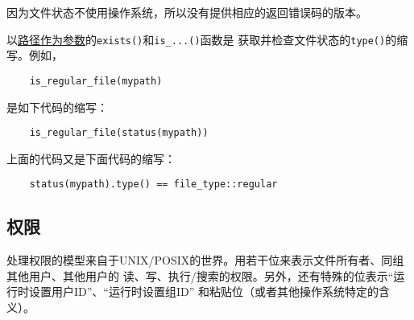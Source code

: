 因为文件状态不使用操作系统，所以没有提供相应的返回错误码的版本。

以\hyperref[ch20.4.1]{路径作为参数}的\texttt{exists()}和\texttt{is\_...()}函数是
获取并检查文件状态的\texttt{type()}的缩写。例如，
\begin{lstlisting}
    is_regular_file(mypath)
\end{lstlisting}
是如下代码的缩写：
\begin{lstlisting}
    is_regular_file(status(mypath))
\end{lstlisting}
上面的代码又是下面代码的缩写：
\begin{lstlisting}
    status(mypath).type() == file_type::regular
\end{lstlisting}

\subsection{权限}\label{ch20.4.3}
处理权限的模型来自于UNIX/POSIX的世界。用若干位来表示文件所有者、同组其他用户、其他用户的
读、写、执行/搜索的权限。另外，还有特殊的位表示“运行时设置用户ID”、“运行时设置组ID”
和粘贴位（或者其他操作系统特定的含义）。

